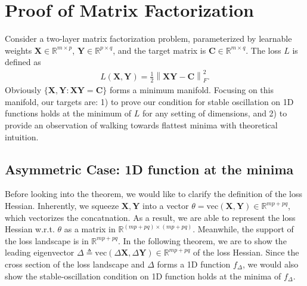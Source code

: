 \documentclass{article}
\theoremstyle{plain}
\theoremstyle{remark}
\newcommand{\norm}[1]{\left\lVert#1\right\rVert}
\def\R{\mathbb{R}}
\begin{document}
\section{Proof of Matrix Factorization}

Consider a two-layer matrix factorization problem, parameterized by learnable weights $\mathbf{X}\in\R^{m\times p}$, $\mathbf{Y}\in\R^{p\times q}$, and the target matrix is $\mathbf{C}\in\R^{m\times q}$. The loss $L$ is defined as
\begin{align}
    L(\mathbf{X},\mathbf{Y})=\frac{1}{2}\norm{\mathbf{X}\mathbf{Y} - \mathbf{C}}_F^2.
\end{align}
Obviously $\{\mathbf{X},\mathbf{Y}:\mathbf{X}\mathbf{Y}=\mathbf{C}\}$ forms a minimum manifold. Focusing on this manifold, our targets are: 1) to prove our condition for stable oscillation on 1D functions holds at the minimum of $L$ for any setting of dimensions, and 2) 
to provide an observation of walking towards flattest minima with theoretical intuition.

\subsection{Asymmetric Case: 1D function at the minima} \label{sec:app_mf_1d}

Before looking into the theorem, we would like to clarify the definition of the loss Hessian. Inherently, we squeeze $\mathbf{X},\mathbf{Y}$ into a vector $\theta=\text{vec}(\mathbf{X},\mathbf{Y})\in\R^{mp+pq}$, which vectorizes the concatnation. As a result, we are able to represent the loss Hessian w.r.t. $\theta$ as a matrix in $\R^{(mp+pq)\times(mp+pq)}$. Meanwhile, the support of the loss landscape is in $\R^{mp+pq}$. In the following theorem, we are to show the leading eigenvector $\Delta\triangleq \text{vec}(\Delta\mathbf{X}, \Delta\mathbf{Y})\in\R^{mp+pq}$ of the loss Hessian. Since the cross section of the loss landscape and $\Delta$ forms a 1D function $f_{\Delta}$, we would also show the stable-oscillation condition on 1D function holds at the minima of $f_{\Delta}$.
\end{document}
